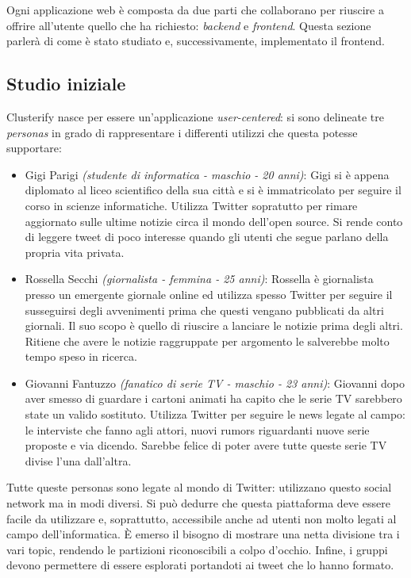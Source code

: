 Ogni applicazione web è composta da due parti che collaborano per riuscire a offrire all'utente quello che ha richiesto: \emph{backend} e \emph{frontend}. Questa sezione parlerà di come è stato studiato e, successivamente, implementato il frontend.

\subsection{Studio iniziale}
	Clusterify nasce per essere un'applicazione \emph{user-centered}: si sono delineate tre \emph{personas} in grado di rappresentare i differenti utilizzi che questa potesse supportare:
	\begin{itemize}
		\item Gigi Parigi \emph{(studente di informatica - maschio - 20 anni)}: Gigi si è appena diplomato al liceo scientifico della sua città e si è immatricolato per seguire il corso in scienze informatiche. Utilizza Twitter sopratutto per rimare aggiornato sulle ultime notizie circa il mondo dell'open source. Si rende conto di leggere tweet di poco interesse quando gli utenti che segue parlano della propria vita privata.
		\item Rossella Secchi \emph{(giornalista - femmina - 25 anni)}: Rossella è giornalista presso un emergente giornale online ed utilizza spesso Twitter per seguire il susseguirsi degli avvenimenti prima che questi vengano pubblicati da altri giornali. Il suo scopo è quello di riuscire a lanciare le notizie prima degli altri. Ritiene che avere le notizie raggruppate per argomento le salverebbe molto tempo speso in ricerca.
		\item Giovanni Fantuzzo \emph{(fanatico di serie TV - maschio - 23 anni)}: Giovanni dopo aver smesso di guardare i cartoni animati ha capito che le serie TV sarebbero state un valido sostituto. Utilizza Twitter per seguire le news legate al campo: le interviste che fanno agli attori, nuovi rumors  riguardanti nuove serie proposte e via dicendo. Sarebbe felice di poter avere tutte queste serie TV divise l'una dall'altra.
	\end{itemize}

	Tutte queste personas sono legate al mondo di Twitter: utilizzano questo social network ma in modi diversi. Si può dedurre che questa piattaforma deve essere facile da utilizzare e, soprattutto, accessibile anche ad utenti non molto legati al campo dell'informatica. È emerso il bisogno di mostrare una netta divisione tra i vari topic, rendendo le partizioni riconoscibili a colpo d'occhio. Infine, i gruppi devono permettere di essere esplorati portandoti ai tweet che lo hanno formato.

